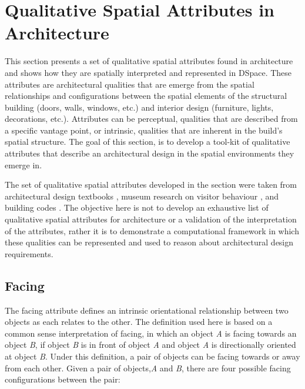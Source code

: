 \documentclass[12pt]{ucthesis}
\begin{document}
\section{Qualitative Spatial Attributes in Architecture}
This section presents a set of qualitative spatial attributes found in architecture and shows how they are spatially interpreted and represented in DSpace. These attributes are architectural qualities that are emerge from the spatial relationships and configurations between the spatial elements of the structural building (doors, walls, windows, etc.) and interior design (furniture, lights, decorations, etc.). Attributes can be perceptual, qualities that are described from a specific vantage point, or intrinsic, qualities that are inherent in the build's spatial structure. The goal of this section, is to develop a tool-kit of qualitative attributes that describe an architectural design in the spatial environments they emerge in. 

The set of qualitative spatial attributes developed in the section were taken from architectural design textbooks \cite{TBD}, museum research on visitor behaviour \cite{TBD}, and building codes \cite{TBD}. The objective here is not to develop an exhaustive list of qualitative spatial attributes for architecture or a validation of the interpretation of the attributes, rather it is to demonstrate a computational framework in which these qualities can be represented and used to reason about architectural design requirements.

\subsection{Facing}
The facing attribute defines an intrinsic orientational relationship between two objects as each relates to the other. The definition used here is based on a common sense interpretation of facing, in which an object \emph{A} is facing towards an object \emph{B}, if object \emph{B} is in front of object \emph{A} and object \emph{A} is directionally oriented at object \emph{B}. Under this definition, a pair of objects can be facing towards or away from each other. Given a pair of objects,\emph{A} and \emph{B}, there are four possible facing configurations between the pair: 
\end{document}
